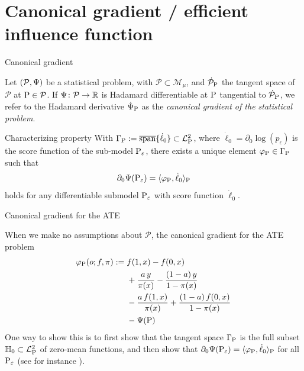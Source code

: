 \documentclass{beamer}\usepackage{listings}
\begin{document}
\section{Canonical gradient / efficient influence function}
\label{sec:org4c04450}
\begin{frame}[label={sec:org2a6d59f}]{Canonical gradient}
\begin{definition}
Let \((\mathcal{P}, \TT)\) be a statistical problem, with \(\mathcal{P} \subset \mathcal{M}_{\mu}\),
and \(\dot{\mathcal{P}}_{\P}\) the tangent space of \(\mathcal{P}\) at \(\P \in \mathcal{P}\). If
\(\TT \colon \mathcal{P} \rightarrow \R\) is Hadamard differentiable at \(\P\) tangential to
\(\dot{\mathcal{P}}_{\P}\), we refer to the Hadamard derivative \(\dot{\TT}_{\P}\) as the
\textit{canonical gradient of the statistical problem}.

\pause
\end{definition}

\begin{block}{Characterizing property}
With $\Gamma_{\P} := \overline{\mathrm{span}}\{\dot{\ell}_0\} \subset \lp$, where
$\dot{\ell}_0 = \partial_0{\log(p_{\epsilon})}$ is the score function of the sub-model
$\P_{\epsilon}$, there exists a unique element $\phi_{\P} \in \Gamma_{\P}$ such that
\begin{equation*}
  \partial_0{\TT(\P_{\epsilon})}
  = \langle \phi_{\P}, \dot{\ell}_0 \rangle_{\P}
\end{equation*}
holds for any differentiable submodel $\P_{\epsilon}$ with score function $\dot{\ell}_0$.
\end{block}
\end{frame}

\begin{frame}[label={sec:org8217328}]{Canonical gradient for the ATE}
\begin{example}[ATE]
When we make no assumptions about \(\mathcal{P}\), the canonical gradient for the ATE problem
\begin{align*}
  \phi_{\P}(o; f, \pi) := \;& f(1,x) - f(0,x) \\
                             & +  \frac{a\,y}{\pi(x)} - \frac{(1-a)\,y}{1-\pi(x)} \\
                             &  - \frac{a\,f(1,x)}{\pi(x)} +
                               \frac{(1-a)\,f(0,x)}{1-\pi(x)} \\
                             &  - \TT(\P)
\end{align*}
\pause One way to show this is to first show that the tangent space $\Gamma_{\P}$ is the full subset
$\mathbb{H}_0 \subset \lp$ of zero-mean functions, and then show that
$ \partial_0{\TT(\P_{\epsilon})} = \langle \phi_{\P}, \dot{\ell}_0 \rangle_{\P}$ for all
$\P_{\epsilon}$ (see for instance \cite{kennedy2016semiparametric}).
\end{example}
\end{frame}
\end{document}
